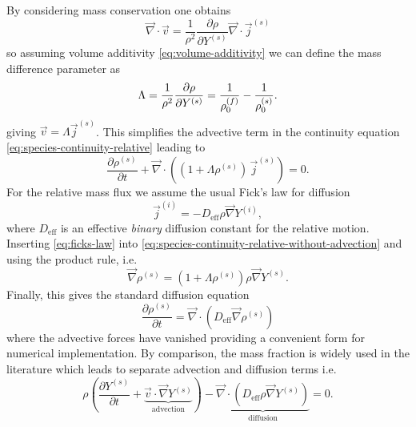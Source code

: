 \documentclass[11pt,twoside]{report}
\begin{document}
By considering mass conservation one obtains
\begin{equation*}
  \vec{\nabla} \cdot \vec{v}
  =
  \frac{1}{\rho^2}
  \frac{\partial \rho}{\partial Y^{(s)}}
  \vec{\nabla} \cdot \vec{j}^{(s)}
\end{equation*}
so assuming volume additivity \eqref{eq:volume-additivity} we can define the mass difference parameter as
\begin{equation}\label{eq:lambda}
  \Lambda
  =
  \frac{1}{\rho^2} \frac{\partial \rho}{\partial Y^{(s)}} \\
  =
  \frac{1}{\rho^{(f)}_0} -
  \frac{1}{\rho^{(s)}_0}.
\end{equation}
giving $\vec{v} = \Lambda \vec{j}^{(s)}$.
This simplifies the advective term in the continuity equation \eqref{eq:species-continuity-relative} leading to
\begin{equation}\label{eq:species-continuity-relative-without-advection}
  \frac{\partial \rho^{(s)}}{\partial t} +
  \vec{\nabla} \cdot \left(
  (1 + \Lambda \rho^{(s)}) \, \vec{j}^{(s)}
  \right) = 0.
\end{equation}
For the relative mass flux we assume the usual Fick's law for diffusion
\begin{equation}\label{eq:ficks-law}
  \vec{j}^{(i)} = -D_\mathrm{eff} \rho \vec{\nabla} Y^{(i)},
\end{equation}
where $D_\mathrm{eff}$ is an effective \emph{binary} diffusion constant for the relative motion.
Inserting \eqref{eq:ficks-law} into \eqref{eq:species-continuity-relative-without-advection} and using the product rule, i.e.\
\begin{equation*}
  \vec{\nabla} \rho^{(s)}
  =
  \left(
  1 +
  \Lambda \rho^{(s)}
  \right)
  \rho
  \vec{\nabla} Y^{(s)}.
\end{equation*}
Finally, this gives the standard diffusion equation
\begin{equation}\label{eq:final-diffusion}
  \frac{\partial \rho^{(s)}}{\partial t}
  =
  \vec{\nabla} \cdot \left(
  D_\mathrm{eff} \vec{\nabla} \rho^{(s)}
  \right)
\end{equation}
where the advective forces have vanished providing a convenient form for numerical implementation.
By comparison, the mass fraction is widely used in the literature which leads to separate advection and diffusion terms i.e.\
\begin{equation*}
  \rho \left(
  \frac{\partial Y^{(s)}}{\partial t} +
  \underbrace{\vec{v} \cdot \vec{\nabla} Y^{(s)}}_\textrm{advection}
  \right)
  -
  \underbrace{\vec{\nabla} \cdot (D_{\textrm{eff}} \rho \vec{\nabla} Y^{(s)})}_\textrm{diffusion}
  = 0.
\end{equation*}
\end{document}
